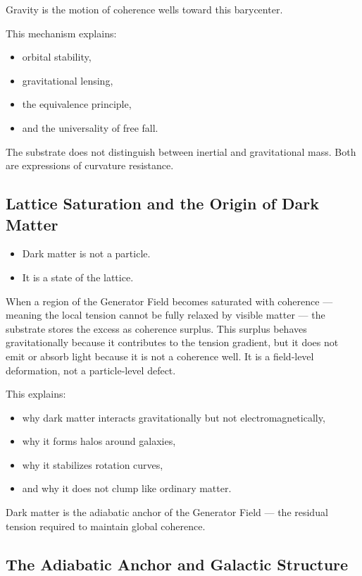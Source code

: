 \documentclass[reprint,amsmath,amssymb,aps,prl,floatfix]{revtex4-2}
\begin{document}
\begin{itemize}
Gravity is the motion of coherence wells toward this barycenter.
\medskip

This mechanism explains:
\begin{itemize}
\item orbital stability,  
\item gravitational lensing,  
\item the equivalence principle,  
\item and the universality of free fall.
\end{itemize}

The substrate does not distinguish between inertial and gravitational mass.  
Both are expressions of curvature resistance.

\subsection{Lattice Saturation and the Origin of Dark Matter}
\begin{itemize}
\item Dark matter is not a particle.  
\item It is a state of the lattice.
\end{itemize}

When a region of the Generator Field becomes saturated with coherence — meaning the local tension cannot be fully relaxed by visible matter — the substrate stores the excess as coherence surplus. This surplus behaves gravitationally because it contributes to the tension gradient, but it does not emit or absorb light because it is not a coherence well. It is a field‑level deformation, not a particle‑level defect.
\medskip

This explains:

\begin{itemize}
\item why dark matter interacts gravitationally but not electromagnetically,  
\item why it forms halos around galaxies,  
\item why it stabilizes rotation curves,  
\item and why it does not clump like ordinary matter.
\end{itemize}

Dark matter is the adiabatic anchor of the Generator Field — the residual tension required to maintain global coherence.

\subsection{The Adiabatic Anchor and Galactic Structure}


\end{itemize}
\end{document}
